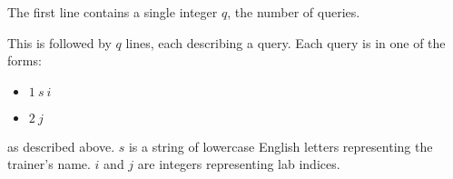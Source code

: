 The first line contains a single integer $q$, the number of queries.

This is followed by $q$ lines, each describing a query. Each query is in one of the forms:

\begin{itemize}
\item $1\ s\ i$

\item $2\ j$
\end{itemize}

as described above. $s$ is a string of lowercase English letters representing the trainer's name. $i$ and $j$ are integers representing lab indices.
